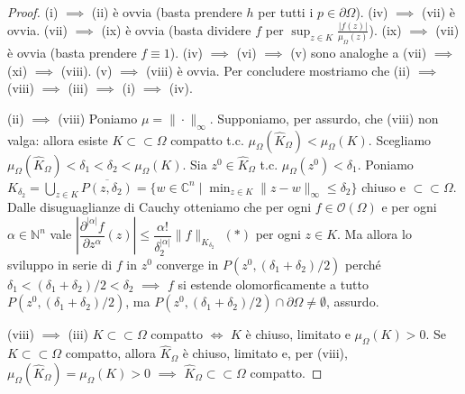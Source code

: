 \begin{proof}
  (i) $\implies$ (ii) è ovvia (basta prendere $h$ per tutti i $p \in \partial\Omega$). (iv) $\implies$ (vii) è ovvia. (vii) $\implies$ (ix) è ovvia (basta dividere $f$ per $\displaystyle \sup_{z \in K} \frac{|f(z)|}{\mu_\Omega(z)}$). (ix) $\implies$ (vii) è ovvia (basta prendere $f \equiv 1$). (iv) $\implies$ (vi) $\implies$ (v) sono analoghe a (vii) $\implies$ (xi) $\implies$ (viii).
  (v) $\implies$ (viii) è ovvia. Per concludere mostriamo che (ii) $\implies$ (viii) $\implies$ (iii) $\implies$ (i) $\implies$ (iv).

  (ii) $\implies$ (viii) Poniamo $\mu=\|\cdot\|_{\infty}$. Supponiamo, per assurdo, che (viii) non valga: allora esiste $K \subset\subset \Omega$ compatto t.c. $\mu_{\Omega}(\hat{K}_\Omega)<\mu_\Omega(K)$. Scegliamo $\mu_\Omega(\hat{K}_\Omega)< \delta_1<\delta_2<\mu_\Omega(K)$.
  Sia $z^0 \in \hat{K}_\Omega$ t.c. $\mu_\Omega(z^0)<\delta_1$.
  Poniamo $\displaystyle K_{\delta_2}=\bigcup_{z \in K} \overline{P(z, \delta_2)}=\{w \in \mathbb{C}^n \mid \min_{z \in K} \|z-w\|_\infty \le \delta_2\}$ chiuso e $\subset\subset \Omega$.
  Dalle disuguaglianze di Cauchy otteniamo che per ogni $f \in \mathcal{O}(\Omega)$ e per ogni $\alpha \in \mathbb{N}^n$ vale $\left|\dfrac{\partial^{|\alpha|}f}{\partial z^\alpha}(z)\right| \le \dfrac{\alpha!}{\delta_2^{|\alpha|}}\|f\|_{K_{\delta_2}}$ $(*)$ per ogni $z \in K$.
  Ma allora lo sviluppo in serie di $f$ in $z^0$ converge in $P(z^0, (\delta_1+\delta_2)/2)$ perché $\delta_1<(\delta_1+\delta_2)/2<\delta_2$ $\implies$ $f$ si estende olomorficamente a tutto $P(z^0, (\delta_1+\delta_2)/2)$, ma $P(z^0, (\delta_1+\delta_2)/2) \cap \partial\Omega\not=\emptyset$, assurdo.

  (viii) $\implies$ (iii) $K \subset\subset \Omega$ compatto $\iff$ $K$ è chiuso, limitato e $\mu_\Omega(K)>0$. Se $K \subset\subset \Omega$ compatto, allora $\hat{K}_\Omega$ è chiuso, limitato e, per (viii), $\mu_\Omega(\hat{K}_\Omega)=\mu_\Omega(K)>0$ $\implies$ $\hat{K}_\Omega \subset\subset \Omega$ compatto.


\end{proof}
